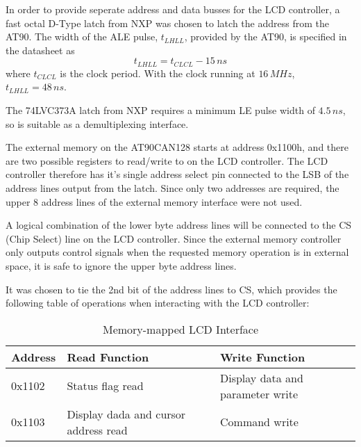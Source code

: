 In order to provide seperate address and data busses for the LCD controller,
a fast octal D-Type latch from NXP was chosen to latch the address
from the AT90. The width of the ALE pulse, $t_{LHLL}$, provided by
the AT90, is specified in the datasheet as \begin{equation}
t_{LHLL}=t_{CLCL}-15\, ns\end{equation}
 where $t_{CLCL}$ is the clock period. With the clock running at
$16\, MHz$, $t_{LHLL}=48\, ns$.

The 74LVC373A latch from NXP requires a minimum LE pulse width of
$4.5\, ns$, so is suitable as a demultiplexing interface.

The external memory on the AT90CAN128 starts at address 0x1100h, and
there are two possible registers to read/write to on the LCD controller.
The LCD controller therefore has it's single address select pin connected
to the LSB of the address lines output from the latch. Since only
two addresses are required, the upper 8 address lines of the external
memory interface were not used.

A logical combination of the lower byte address lines will be connected
to the CS (Chip Select) line on the LCD controller. Since the external
memory controller only outputs control signals when the requested
memory operation is in external space, it is safe to ignore the upper
byte address lines.

It was chosen to tie the 2nd bit of the address lines to CS, which
provides the following table of operations when interacting with the
LCD controller:

%
\begin{table}
\begin{centering}
\caption{Memory-mapped LCD Interface}

\par\end{centering}

\centering{}\begin{tabular}{|l|l|l|}
\hline 
Address  & Read Function  & Write Function\tabularnewline
\hline
\hline 
0x1102  & Status flag read  & Display data and parameter write\tabularnewline
\hline 
0x1103  & Display dada and cursor address read  & Command write\tabularnewline
\hline
\end{tabular}
\end{table}
